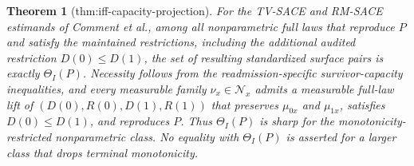 \documentclass{article}
\newtheorem{theorem}{Theorem}
\begin{document}
\begin{theorem}[thm:iff-capacity-projection]\label{thm:iff-capacity-projection}
For the TV-SACE and RM-SACE estimands of Comment et al., among all nonparametric full laws that reproduce \(P\) and satisfy the maintained restrictions, including the additional audited restriction \(D(0)\leq D(1)\), the set of resulting standardized surface pairs is exactly \(\Theta_I(P)\).  Necessity follows from the readmission-specific survivor-capacity inequalities, and every measurable family \(\nu_x\in\mathcal N_x\) admits a measurable full-law lift of \((D(0),R(0),D(1),R(1))\) that preserves \(\mu_{0x}\) and \(\mu_{1x}\), satisfies \(D(0)\leq D(1)\), and reproduces \(P\).  Thus \(\Theta_I(P)\) is sharp for the monotonicity-restricted nonparametric class.  No equality with \(\Theta_I(P)\) is asserted for a larger class that drops terminal monotonicity.
\end{theorem}
\end{document}
